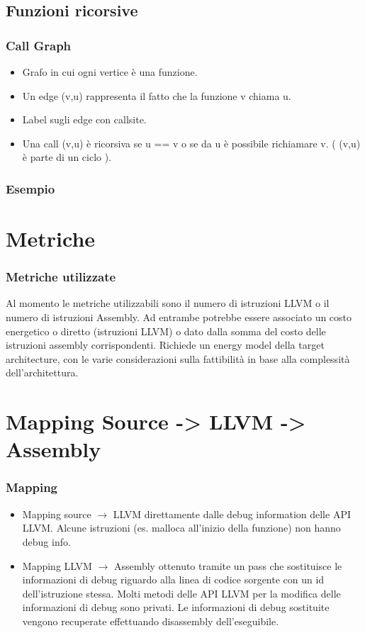 \documentclass{beamer}
\begin{document}
\subsection{Funzioni ricorsive}

\begin{frame}
\frametitle{Call Graph}
\begin{itemize}
\item Grafo in cui ogni vertice è una funzione.
\item Un edge (v,u) rappresenta il fatto che la funzione v chiama u.
\item Label sugli edge con callsite.
\item Una call (v,u) è ricorsiva se u == v o se da u è possibile richiamare v. ( (v,u) è parte di un ciclo ).
\end{itemize}
\end{frame}

\begin{frame}
\frametitle{Esempio}
\end{frame}

\section{Metriche}

\begin{frame}
\frametitle{Metriche utilizzate}
Al momento le metriche utilizzabili sono il numero di istruzioni LLVM o il numero di istruzioni Assembly. \linebreak
Ad entrambe potrebbe essere associato un costo energetico o diretto (istruzioni LLVM) o dato dalla somma del costo delle istruzioni assembly corrispondenti. \linebreak
Richiede un energy model della target architecture, con le varie considerazioni sulla fattibilità in base alla complessità dell'architettura.
\end{frame}

\section{Mapping Source -> LLVM -> Assembly}
\begin{frame}
\frametitle{Mapping}
\begin{itemize}
\item Mapping source $\rightarrow$ LLVM direttamente dalle debug information delle API LLVM. \linebreak Alcune istruzioni (es. malloca all'inizio della funzione) non hanno debug info.
\item Mapping LLVM $\rightarrow$ Assembly ottenuto tramite un pass che sostituisce le informazioni di debug riguardo alla linea di codice sorgente con un id dell'istruzione stessa. \linebreak Molti metodi delle API LLVM per la modifica delle informazioni di debug sono privati. \linebreak Le informazioni di debug sostituite vengono recuperate effettuando disassembly dell'eseguibile.
\end{itemize}
\end{frame}
\end{document}
